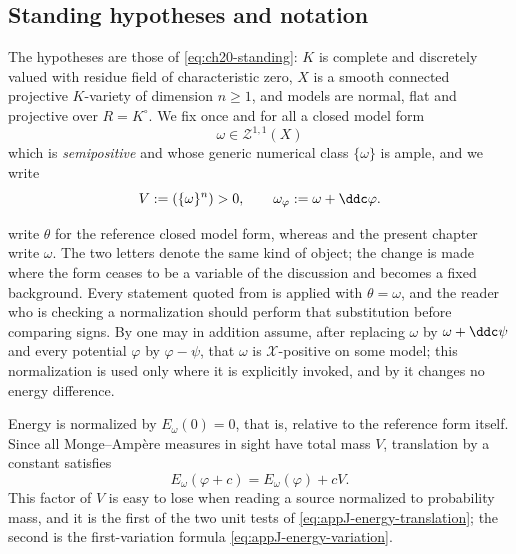 \subsection{Standing hypotheses and notation}
\label{sec:ch26-hypotheses}

The hypotheses are those of \eqref{eq:ch20-standing}: \(K\) is complete and
discretely valued with residue field of characteristic zero, \(X\) is a
smooth connected projective \(K\)-variety of dimension \(n\geq1\), and models
are normal, flat and projective over \(R=K^\circ\).  We fix once and for all a
closed model form
\[
 \omega\in\mathcal Z^{1,1}(X)
\]
which is \emph{semipositive} and whose generic numerical class \(\{\omega\}\)
is ample, and we write
\begin{equation}
\label{eq:ch26-standing-notation}
 V:=(\{\omega\}^n)>0,
 \qquad
 \omega_\varphi:=\omega+\ddc\varphi .
\end{equation}

\begin{remark}
\label{rem:ch26-omega-theta}
 write \(\theta\) for the
reference closed model form, whereas  and the present
chapter write \(\omega\).  The two letters denote the same kind of object;
the change is made where the form ceases to be a variable of the discussion
and becomes a fixed background.  Every statement quoted from
 is applied with \(\theta=\omega\), and
the reader who is checking a normalization should perform that substitution
before comparing signs.  By  one may
in addition assume, after replacing \(\omega\) by \(\omega+\ddc\psi\) and
every potential \(\varphi\) by \(\varphi-\psi\), that \(\omega\) is
\(\mathcal X\)-positive on some model; this normalization is used only where
it is explicitly invoked, and by
 it changes no energy difference.
\end{remark}

Energy is normalized by \(E_\omega(0)=0\), that is, relative to the reference
form itself.  Since all Monge--Amp\`ere measures in sight have total mass
\(V\), translation by a constant satisfies
\begin{equation}
\label{eq:bfj-energy-translation}
                    E_\omega(\varphi+c)=E_\omega(\varphi)+cV .
\end{equation}
This factor of \(V\) is easy to lose when reading a source normalized to
probability mass, and it is the first of the two unit tests of
\eqref{eq:appJ-energy-translation}; the second is the first-variation formula
\eqref{eq:appJ-energy-variation}.

